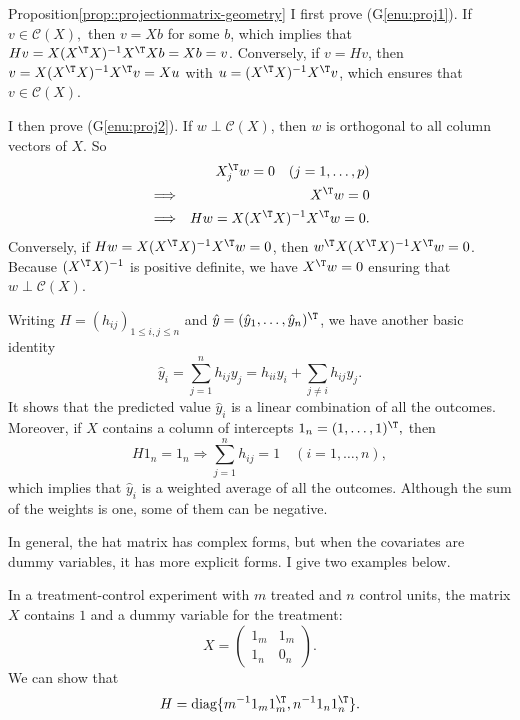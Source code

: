 \begin{myproof}{Proposition}{\ref{prop::projectionmatrix-geometry}}
I first prove (G\ref{enu:proj1}).
If $v\in\mathcal{C}(X),$ then $v=Xb$ for some $b$, which implies
that $Hv=X(X^{\T}X)^{-1}X^{\T}Xb=Xb=v$. Conversely, if $v=Hv$, then $v=X(X^{\T}X)^{-1} X^{\T}v = Xu$ with $u=(X^{\T}X)^{-1} X^{\T}v$, which ensures that $v\in \mathcal{C}(X)$. 

I then prove (G\ref{enu:proj2}). 
If $w\perp\mathcal{C}(X)$, then $w$ is orthogonal to all column
vectors of $X$. So
\begin{eqnarray*}
&&  X_{j}^{\T}w=0\quad(j=1,\ldots,p) \\
&\Longrightarrow & X^{\T}w=0 \\
&\Longrightarrow& Hw=X(X^{\T}X)^{-1}X^{\T}w=0.
\end{eqnarray*}
Conversely, if $Hw=  X(X^{\T}X)^{-1}X^{\T}w =0$, then $w^{\T} X(X^{\T}X)^{-1}X^{\T}w=0$. Because $(X^{\T}X)^{-1}$ is positive definite, we have $X^{\T}w=0$ ensuring that $w\perp\mathcal{C}(X)$. 
\end{myproof}

 

Writing $H=(h_{ij})_{1\leq i,j\leq n}$ and $\hat{y}=(\hat{y}_{1},\ldots,\hat{y}_{n})^{\T}$,
we have another basic identity 
$$
\hat{y}_{i}=\sum_{j =1}^{n}h_{ij}y_{j} =h_{ii}y_{i}+\sum_{j\neq i}h_{ij}y_{j}.
$$
 It shows that the predicted value $\hat{y}_{i}$ is a linear combination
of all the outcomes. Moreover, if $X$ contains a column of intercepts
$1_{n}=(1,\ldots,1)^{\T},$ then 
\[
H1_{n}=1_{n}\Longrightarrow\sum_{j=1}^{n}h_{ij}=1\quad(i=1,\ldots,n),
\]
which implies that $\hat{y}_{i}$ is a weighted average of all the
outcomes. Although the sum of the weights is one, some of them can be negative. 


 
In general, the hat matrix has complex forms, but when the covariates are dummy variables, it has more explicit forms. I give two examples below. 

\begin{example}
\label{eg::treatment-control-H}
In a treatment-control experiment with $m$ treated and $n$ control units, the matrix $X$ contains $1$ and a dummy variable for the treatment:
$$
X = \begin{pmatrix}
1_m& 1_m\\
1_n& 0_n 
\end{pmatrix}.
$$
We can show that 
$$
H = \textup{diag}\{ m^{-1} 1_m 1_m^{\T} , n^{-1} 1_n 1_n^{\T} \}.
$$
\end{example}


